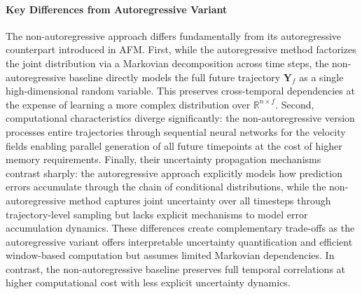 \documentclass[a4paper,10pt,twocolumn,preprint,3p]{elsarticle}
\begin{document}
\paragraph{Key Differences from Autoregressive Variant} The non-autoregressive approach differs fundamentally from its autoregressive counterpart introduced in AFM. First, while the autoregressive method factorizes the joint distribution via a Markovian decomposition across time steps, the non-autoregressive baseline directly models the full future trajectory $\mathbf{Y}_f$
as a single high-dimensional random variable. This preserves cross-temporal dependencies at the expense of learning a more complex distribution over $\mathbb{R}^{n \times f}$. 
Second, computational characteristics diverge significantly: the non-autoregressive version processes entire trajectories through sequential neural networks for the velocity fields enabling parallel generation of all future timepoints at the cost of higher memory requirements. Finally, their uncertainty propagation mechanisms contrast sharply: the autoregressive approach explicitly models how prediction errors accumulate through the chain of conditional distributions, while the non-autoregressive method captures joint uncertainty over all timesteps through trajectory-level sampling but lacks explicit mechanisms to model error accumulation dynamics. These differences create complementary trade-offs as the autoregressive variant offers interpretable uncertainty quantification and efficient window-based computation but assumes limited Markovian dependencies. In contrast, the non-autoregressive baseline preserves full temporal correlations at higher computational cost with less explicit uncertainty dynamics.
\end{document}
